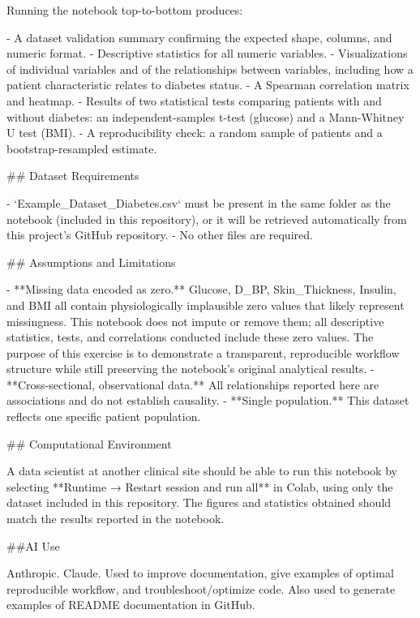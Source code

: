 Running the notebook top-to-bottom produces:

- A dataset validation summary confirming the expected shape, columns, and
  numeric format.
- Descriptive statistics for all numeric variables.
- Visualizations of individual variables and of the relationships between
  variables, including how a patient characteristic relates to diabetes status.
- A Spearman correlation matrix and heatmap.
- Results of two statistical tests comparing patients with and without diabetes:
  an independent-samples t-test (glucose) and a Mann-Whitney U test (BMI).
- A reproducibility check: a random sample of patients and a 
  bootstrap-resampled estimate.

## Dataset Requirements

- `Example_Dataset_Diabetes.csv` must be present in the same folder as the
  notebook (included in this repository), or it will be retrieved automatically
  from this project's GitHub repository.
- No other files are required.

## Assumptions and Limitations

- **Missing data encoded as zero.** Glucose, D_BP, Skin_Thickness, Insulin, and
  BMI all contain physiologically implausible zero values that likely represent
  missingness. This notebook does not impute or remove them; all descriptive
  statistics, tests, and correlations conducted include these zero values. The
  purpose of this exercise is to demonstrate a transparent, reproducible workflow
  structure while still preserving the notebook's original analytical results.
- **Cross-sectional, observational data.** All relationships reported here are
  associations and do not establish causality.
- **Single population.** This dataset reflects one specific patient population.

## Computational Environment

A data scientist at another clinical site should be able to run this notebook by
selecting **Runtime → Restart session and run all** in Colab, using only the
dataset included in this repository. The figures and statistics obtained should
match the results reported in the notebook.

##AI Use

Anthropic. Claude. Used to improve documentation, give examples of optimal 
reproducible workflow, and troubleshoot/optimize code. Also used to generate
 examples of README documentation in GitHub.
